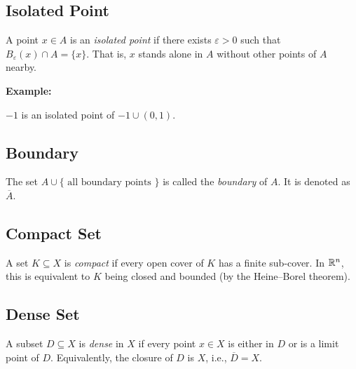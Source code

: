 \subsection{Isolated Point} 
	      
A point \( x \in A \) is an \emph{isolated point} if there exists \( \varepsilon > 0 \) such that \( B_\varepsilon(x) \cap A = \{x\} \). 
That is, \(x\) stands alone in \(A\) without other points of \(A\) nearby.

\textbf{Example:}

\(-1\) is an isolated point of \({-1} \cup (0,1)\).

\subsection{Boundary}

The set \(A \cup \{\text{ all boundary points }\}\) is called the \emph{boundary} of \(A\). It is denoted as \(\overline{A}\).

\subsection{Compact Set} 

A set \( K \subseteq X \) is \emph{compact} if every open cover of \( K \) has a finite sub-cover. 
In \(\mathbb{R}^n\), this is equivalent to \( K \) being closed and bounded (by the Heine–Borel theorem).

\subsection{Dense Set} 
	      
A subset \( D \subseteq X \) is \emph{dense} in \(X\) if every point \( x \in X \) is either in \( D \) or is a limit point of \( D \). 
Equivalently, the closure of \( D \) is \(X\), i.e., \( \overline{D} = X \).


